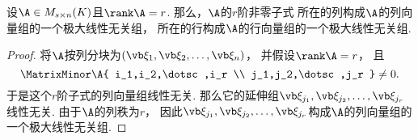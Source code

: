 

\begin{corollary}
设\(\A\in M_{s \times n}(K)\)且\(\rank\A=r\).
那么，\(\A\)的\(r\)阶非零子式
所在的列构成\(\A\)的列向量组的一个极大线性无关组，
所在的行构成\(\A\)的行向量组的一个极大线性无关组.
\begin{proof}
将\(\A\)按列分块为\((\a_1,\a_2,\dotsc,\a_n)\)，
并假设\(\rank\A = r\)，
且\[
	\MatrixMinor\A{
		i_1,i_2,\dotsc,i_r \\
		j_1,j_2,\dotsc,j_r
	} \neq 0.
\]
于是这个\(r\)阶子式的列向量组线性无关.
那么它的延伸组\(\a_{j_1},\a_{j_2},\dotsc,\a_{j_r}\)线性无关.
由于\(\A\)的列秩为\(r\)，
因此\(\a_{j_1},\a_{j_2},\dotsc,\a_{j_r}\)构成\(\A\)的列向量组的一个极大线性无关组.
\end{proof}
\end{corollary}

